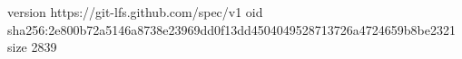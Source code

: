 version https://git-lfs.github.com/spec/v1
oid sha256:2e800b72a5146a8738e23969dd0f13dd4504049528713726a4724659b8be2321
size 2839
